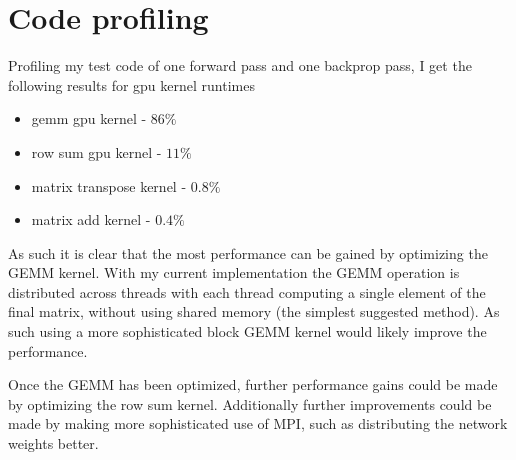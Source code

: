 \section{Code profiling}
Profiling my test code of one forward pass and one backprop pass, I get the following results for gpu kernel runtimes
\begin{itemize}
	\item gemm gpu kernel - $86\%$
	\item row sum gpu kernel - $11\%$
	\item matrix transpose kernel - $0.8\%$
	\item matrix add kernel - $0.4\%$
\end{itemize}

As such it is clear that the most performance can be gained by optimizing the GEMM kernel. With my current implementation the GEMM operation is distributed across threads with each thread computing a single element of the final matrix, without using shared memory (the simplest suggested method). As such using a more sophisticated block GEMM kernel would likely improve the performance.

Once the GEMM has been optimized, further performance gains could be made by optimizing the row sum kernel. Additionally further improvements could be made by making more sophisticated use of MPI, such as distributing the network weights better.

